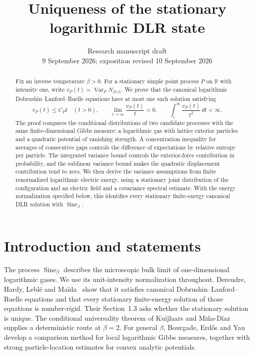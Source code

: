 \documentclass[11pt,reqno]{amsart}
\title[Uniqueness of the logarithmic DLR state]{Uniqueness of the stationary logarithmic DLR state}
\date{Research manuscript draft\\9 September 2026; exposition revised 10 September 2026}
\numberwithin{equation}{section}
\theoremstyle{definition}
\theoremstyle{remark}
\newcommand{\R}{\mathbb R}
\newcommand{\1}{\mathbf 1}
\newcommand{\Var}{\operatorname{Var}}
\newcommand{\Sine}{\operatorname{Sine}}
\newcommand{\dd}{\,d}
\begin{document}
\begin{abstract}
Fix an inverse temperature $\beta>0$. For a stationary simple point
process $P$ on $\R$ with intensity one, write
$v_P(t)=\Var_P N_{(0,t]}$. We prove that the canonical logarithmic
Dobrushin--Lanford--Ruelle equations have at most one such solution
satisfying
\[
v_P(t)\le C_Pt\quad(t>0),\qquad
\lim_{t\to\infty}\frac{v_P(t)}t=0,\qquad
\int_1^\infty\frac{v_P(t)}{t^2}\dd t<\infty.
\]
The proof compares the conditional distributions of two candidate
processes with the same finite-dimensional Gibbs measure: a logarithmic
gas with lattice exterior particles and a quadratic potential of
vanishing strength. A concentration inequality for averages of
consecutive gaps controls the difference of expectations by relative
entropy per particle. The integrated variance bound controls the
exterior-force contribution in probability, and the sublinear variance
bound makes the quadratic displacement contribution tend to zero.
We then derive the variance assumptions from finite renormalized
logarithmic electric energy, using a stationary joint distribution of
the configuration and an electric field and a covariance spectral
estimate. With the energy normalization specified below, this identifies
every stationary finite-energy canonical DLR solution with $\Sine_\beta$.
\end{abstract}
\maketitle

\section{Introduction and statements}

The process $\Sine_\beta$ describes the microscopic bulk limit of
one-dimensional logarithmic gases. We use its unit-intensity
normalization throughout. Dereudre, Hardy, Lebl\'e and
Ma\"ida~\cite{DHLM} show that it satisfies canonical Dobrushin--Lanford--Ruelle
equations and that every stationary finite-energy solution of those
equations is number-rigid. Their Section~1.3 asks whether the stationary
solution is unique. The conditional universality theorem of Kuijlaars and
Mi\~na-D\'iaz~\cite{KMD} supplies a deterministic route at $\beta=2$.
For general $\beta$, Bourgade, Erd\H{o}s and Yau~\cite{BEY} develop a
comparison method for local logarithmic Gibbs measures, together with
strong particle-location estimates for convex analytic potentials.
\end{document}
